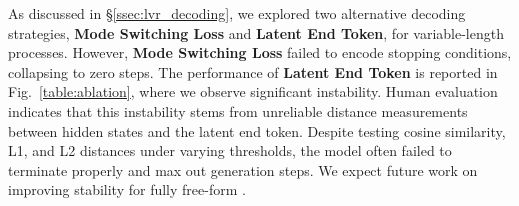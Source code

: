 

As discussed in \S\ref{ssec:lvr_decoding}, we explored two alternative decoding strategies, \textbf{Mode Switching Loss} and \textbf{Latent End Token}, for variable-length \modelname processes. However, \textbf{Mode Switching Loss} failed to encode stopping conditions, collapsing to zero \modelname steps. The performance of \textbf{Latent End Token} is reported in Fig.~\ref{table:ablation}, where we observe significant instability. Human evaluation indicates that this instability stems from unreliable distance measurements between \modelname hidden states and the latent end token. Despite testing cosine similarity, L1, and L2 distances under varying thresholds, the model often failed to terminate properly and max out generation steps. We expect future work on improving stability for fully free-form \modelfullname.

